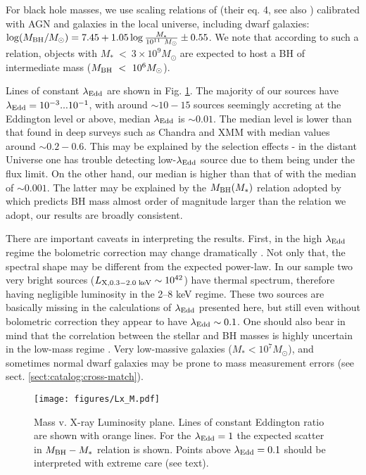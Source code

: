 \documentclass[fleqn,usenatbib]{mnras}
\newcommand{\msun}{M_\odot}
\begin{document}
For black hole masses, we use scaling relations of \citealt{Reines2015} (their eq. 4, see also \citealt{Suh2020}) calibrated with AGN and galaxies in the local universe, including dwarf galaxies:
$\log(M_{\rm BH}/\msun) = 7.45 + 1.05\log\frac{M_*}{10^{11}~\msun} \pm 0.55$. We note that according to such a relation, objects with $M_*~<~3\times10^9 \msun$ are expected to host a BH of intermediate mass ($M_{\rm BH}~<~10^6 \msun$). 


Lines of constant $\lambda_{\rm Edd}$ are shown in Fig. \ref{fig:Lx_M}.  The majority of our sources have $\lambda_{\rm Edd}=10^{-3}...10^{-1}$, with around $\sim10-15$ sources seemingly accreting at the Eddington level or above, median $\lambda_{\rm Edd}$ is $\sim0.01$. The median level is lower than that found in deep surveys such as Chandra \citep{Mezcua2018} and XMM \citep{Zou2023} with median values around $\sim0.2-0.6$. This may be explained by the selection effects - in the distant Universe one has trouble detecting low-$\lambda_{\rm Edd}$ source due to them being under the flux limit. On the other hand, our median is higher than that of \citet{Birchall2020} with the median of $\sim0.001$. The latter may be explained by the $M_{\rm BH}(M_*)$ relation adopted by \citeauthor{Birchall2020} which predicts BH mass almost order of magnitude larger than the relation we adopt, our results are broadly consistent.


There are important caveats in interpreting the results. First, in the high $\lambda_{\rm Edd}$ regime the bolometric correction may change dramatically \citep{Duras2020}. Not only that, the spectral shape may be different from the expected power-law. In our sample two very bright sources ($L_{\rm X, 0.3-2.0 \text{ keV}}\sim10^{42}$) have thermal spectrum, therefore having negligible luminosity in the 2--8 keV regime. These two sources are basically missing in the calculations of $\lambda_{\rm Edd}$ presented here, but still even without bolometric correction they appear to have $\lambda_{\rm Edd}\sim0.1$. One should also bear in mind that the correlation between the stellar and BH masses is highly uncertain in the low-mass regime \citep{Suh2020, Mezcua2023}.  Very low-massive galaxies ($M_*<10^7\msun$), and sometimes normal dwarf galaxies may be prone to mass measurement errors (see sect. \ref{sect:catalog:cross-match}). 





\begin{figure}
    \texttt{[image: figures/Lx\_M.pdf]}
    \caption[Dwarf galaxies stellar mass - X-ray luminosity plane.]{Mass v. X-ray Luminosity plane. Lines of constant Eddington ratio are shown with orange lines. For the $\lambda_{\rm Edd}=1$ the expected scatter in $M_{\rm BH}-M_*$ relation is shown. Points above $\lambda_{\rm Edd}=0.1$ should be interpreted with extreme care (see text). }
    \label{fig:Lx_M}
\end{figure}
\end{document}
